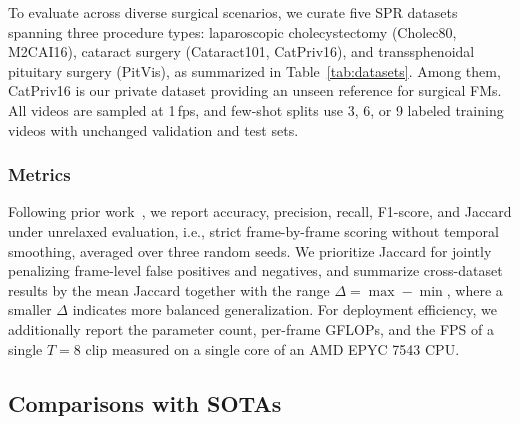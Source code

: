 To evaluate across diverse surgical scenarios, we curate five SPR
datasets spanning three procedure types: laparoscopic cholecystectomy (Cholec80,
M2CAI16), cataract surgery (Cataract101, CatPriv16), and transsphenoidal pituitary
surgery (PitVis), as summarized in Table~\ref{tab:datasets}. Among them,
CatPriv16 is our private dataset providing an
unseen reference for surgical FMs. All videos are sampled at
1\,fps, and few-shot splits use 3, 6, or 9 labeled training videos with unchanged
validation and test sets.

\subsubsection{Metrics}
%
%

Following prior work~\cite{jin2021temporal,yang2024surgformer}, we report accuracy,
precision, recall, F1-score, and Jaccard under unrelaxed evaluation, i.e., strict
frame-by-frame scoring without temporal smoothing, averaged over
three random seeds. We prioritize Jaccard for jointly penalizing frame-level false
positives and negatives, and summarize cross-dataset results by the mean Jaccard
together with the range $\Delta=\max-\min$, where a smaller $\Delta$ indicates more
balanced generalization. For deployment efficiency, we additionally report the
parameter count, per-frame GFLOPs, and the FPS of a single $T{=}8$ clip measured
on a single core of an AMD EPYC 7543 CPU.


\subsection{Comparisons with SOTAs}
